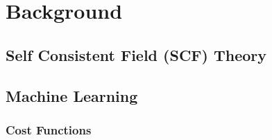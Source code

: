 \chapter{Background}
\label{sec:background}

\section{Self Consistent Field (SCF) Theory}
\label{sec:background_scf}

\section{Machine Learning}
\label{sec:background_ml}

\subsection{Cost Functions}
\label{subsec:background_cost_function}
